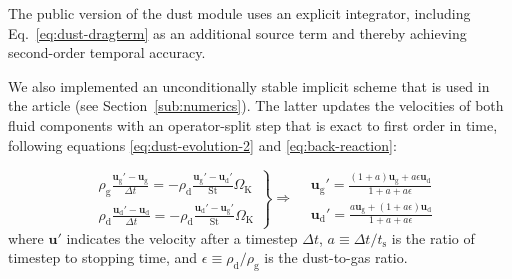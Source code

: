 \documentclass[fleqn,usenatbib,useAMS]{mnras}
\newcommand{\OmegaK}{\Omega_\mathrm{K}}
\newcommand{\vel}{\bm{u}}
\newcommand{\velg}{\vel_\mathrm{g}}
\newcommand{\veld}{\vel_\mathrm{d}}
\newcommand{\St}{\mathrm{St}}
\newcommand{\ts}{t_\mathrm{s}}
\begin{document}
The public version of the dust module uses an explicit integrator, including Eq.~\eqref{eq:dust-dragterm} as an additional source term and thereby achieving second-order temporal accuracy. 

We also implemented an unconditionally stable implicit scheme that is used in the article (see Section~\ref{sub:numerics}). The latter updates the velocities of both fluid components with an operator-split step that is exact to first order in time, following equations \eqref{eq:dust-evolution-2} and \eqref{eq:back-reaction}:

\begin{equation}
\label{eq:dust-update}
  \left.
    \begin{aligned}
      & \rho_\text{g}\frac{\velg' - \velg}{\Delta t} = -\rho_\text{d}\frac{\velg'-\veld'}{\St}\OmegaK \\
      & \rho_\text{d}\frac{\veld' - \veld}{\Delta t} = -\rho_\text{d}\frac{\veld'-\velg'}{\St}\OmegaK
    \end{aligned}
  \right\} \Rightarrow
    \begin{aligned}
      & \velg' = \frac{(1+a)\velg + a\epsilon\veld}{1+a+a\epsilon}\\
      & \veld' = \frac{a\velg + (1+a\epsilon)\veld}{1+a+a\epsilon}
    \end{aligned}
\end{equation}
%
where $\vel'$ indicates the velocity after a timestep $\Delta t$, $a \equiv \Delta t/\ts$ is the ratio of timestep to stopping time, and $\epsilon \equiv \rho_\text{d} / \rho_\text{g}$ is the dust-to-gas ratio.
\end{document}
